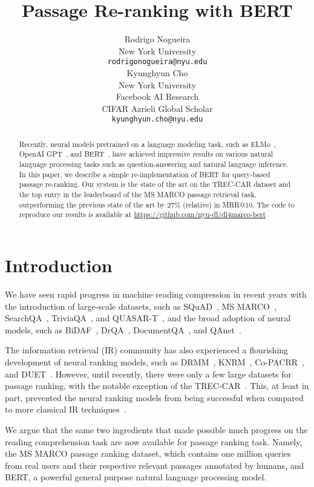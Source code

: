 \documentclass{article} \usepackage{iclr2019_conference}
\title{Passage Re-ranking with BERT}
\author{Rodrigo Nogueira\\
New York University\\
\texttt{rodrigonogueira@nyu.edu} \\
\And
Kyunghyun Cho \\
New York University\\
Facebook AI Research\\
CIFAR Azrieli Global Scholar\\
\texttt{kyunghyun.cho@nyu.edu} \\
}
\begin{document}
\maketitle
\begin{abstract}
Recently, neural models pretrained on a language modeling task, such as ELMo~\citep{peters2017semi}, OpenAI GPT~\citep{radford2018improving}, and BERT~\citep{devlin2018bert}, have achieved impressive results on various natural language processing tasks such as question-answering and natural language inference. In this paper, we describe a simple re-implementation of BERT for query-based passage re-ranking. Our system is the state of the art on the TREC-CAR dataset and the top entry in the leaderboard of the MS MARCO passage retrieval task, outperforming the previous state of the art by 27\% (relative) in MRR@10. The code to reproduce our results is available at \url{https://github.com/nyu-dl/dl4marco-bert}
\end{abstract}

\section{Introduction}

We have seen rapid progress in machine reading compression in recent years with the introduction of large-scale datasets, such as SQuAD~\citep{rajpurkar2016squad}, MS MARCO~\citep{nguyen2016ms}, SearchQA~\citep{dunn2017searchqa}, TriviaQA~\citep{joshi2017triviaqa}, and QUASAR-T~\citep{dhingra2017quasar}, and the broad adoption of neural models, such as BiDAF~\citep{seo2016bidirectional}, DrQA~\citep{chen2017reading}, DocumentQA~\citep{clark2017simple}, and QAnet~\citep{yu2018qanet}.

The information retrieval (IR) community has also experienced a flourishing development of neural ranking models, such as DRMM~\citep{guo2016deep}, KNRM~\citep{xiong2017end}, Co-PACRR~\citep{hui2018co}, and DUET~\citep{mitra2017learning}. However, until recently, there were only a few large datasets for passage ranking, with the notable exception of the TREC-CAR~\citep{dietz2017trec}. This, at least in part, prevented the neural ranking models from being successful when compared to more classical IR techniques~\citep{lin2019neural}.

We argue that the same two ingredients that made possible much progress on the reading comprehension task are now available for passage ranking task. Namely, the MS MARCO passage ranking dataset, which contains one million queries from real users and their respective relevant passages annotated by humans, and BERT, a powerful general purpose natural language processing model.
\end{document}
